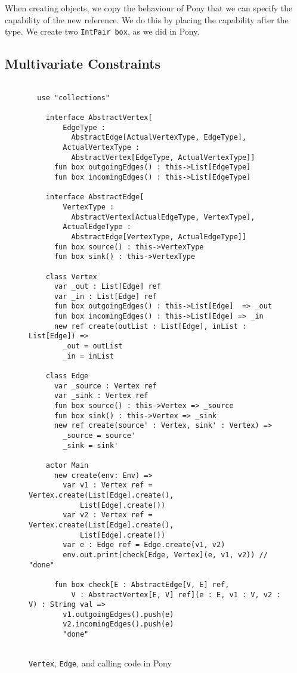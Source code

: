 When creating objects, we copy the behaviour of Pony that we can specify the capability of the new reference. We do this by placing the capability after the type. We create two \texttt{IntPair box}, as we did in Pony. \\

\newpage

\subsection{Multivariate Constraints}

\begin{figure}[H]
    \centering
    \begin{verbatim}
    
  use "collections"
  
    interface AbstractVertex[
        EdgeType :
          AbstractEdge[ActualVertexType, EdgeType],
        ActualVertexType : 
          AbstractVertex[EdgeType, ActualVertexType]]
      fun box outgoingEdges() : this->List[EdgeType]
      fun box incomingEdges() : this->List[EdgeType]
  
    interface AbstractEdge[
        VertexType : 
          AbstractVertex[ActualEdgeType, VertexType],
        ActualEdgeType : 
          AbstractEdge[VertexType, ActualEdgeType]]
      fun box source() : this->VertexType
      fun box sink() : this->VertexType
  
    class Vertex
      var _out : List[Edge] ref 
      var _in : List[Edge] ref
      fun box outgoingEdges() : this->List[Edge]  => _out
      fun box incomingEdges() : this->List[Edge] => _in
      new ref create(outList : List[Edge], inList : List[Edge]) =>
        _out = outList
        _in = inList
  
    class Edge
      var _source : Vertex ref
      var _sink : Vertex ref
      fun box source() : this->Vertex => _source
      fun box sink() : this->Vertex => _sink
      new ref create(source' : Vertex, sink' : Vertex) =>
        _source = source'
        _sink = sink'
  
    actor Main
      new create(env: Env) =>
        var v1 : Vertex ref = Vertex.create(List[Edge].create(),
            List[Edge].create())
        var v2 : Vertex ref = Vertex.create(List[Edge].create(),
            List[Edge].create())
        var e : Edge ref = Edge.create(v1, v2)
        env.out.print(check[Edge, Vertex](e, v1, v2)) // "done"
      
      fun box check[E : AbstractEdge[V, E] ref, 
          V : AbstractVertex[E, V] ref](e : E, v1 : V, v2 : V) : String val =>
        v1.outgoingEdges().push(e)
        v2.incomingEdges().push(e)
        "done"
 
    \end{verbatim}
    \caption{\texttt{Vertex}, \texttt{Edge}, and calling code in Pony}
    \label{fig:pony-graphlike}
\end{figure}

